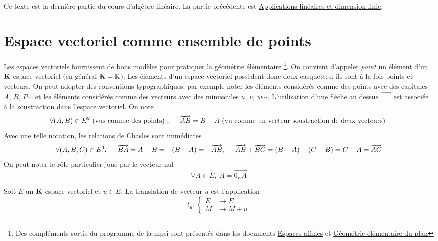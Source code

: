 

Ce texte est la dernière partie du cours d'algèbre linéaire. La partie précédente est \href{\baseurl C9587.pdf}{Applications linéaires et dimension finie}.

\section{Espace vectoriel comme ensemble de points}
Les espaces vectoriels fournissent de bons modèles pour pratiquer la géométrie élémentaire \footnote{Des compléments sortis du programme de la mpsi sont présentés dans les documents \href{\baseurl C5727.pdf}{Espaces affines} et \href{\baseurl C2005.pdf}{Géométrie élémentaire du plan}}.\newline
On convient d'appeler \emph{point} un élément d'un $\mathbf{K}$-espace vectoriel (en général $\mathbf{K} = \mathbb{R}$). Les éléments d'un espace vectoriel possèdent donc deux \og casquettes\fg: ils sont à la fois points et vecteurs. On peut adopter des conventions typographiques; par exemple noter les éléments considérés comme des points avec des capitales $A$, $B$, $P\cdots$ et les éléments considérés comme des vecteurs avec des minuscules $u$, $v$, $w\cdots$.\newline
L'utilisation d'une flèche au dessus $\overrightarrow{\phantom{AB}}$ est associée à la soustraction dans l'espace vectoriel. On note
\begin{displaymath}
  \forall (A,B)\in E^2 \text{ (vus comme des points) }, \hspace{0.5cm}
  \overrightarrow{AB} = B - A \text{ (vu comme un vecteur soustraction de deux vecteurs) }
\end{displaymath}
Avec une telle notation, les relations de Chasles  sont immédiates
\begin{displaymath}
  \forall (A,B,C)\in E^3, \hspace{0.5cm} \overrightarrow{BA} = A - B = -(B-A) = -\overrightarrow{AB},\hspace{0.5cm}
\overrightarrow{AB} + \overrightarrow{BC} = (B-A) + (C-B) = C - A = \overrightarrow{AC}
  \end{displaymath}
On peut noter le rôle particulier joué par le vecteur nul
\begin{displaymath}
  \forall A \in E, \; A = \overrightarrow{0_E A}
\end{displaymath}
\begin{defi}[translation]
  Soit $E$ un $\mathbf{K}$-espace vectoriel et $u\in E$. La translation de vecteur $u$ est l'application
  \begin{displaymath}
    t_u:
    \left\lbrace 
    \begin{aligned}
      E &\rightarrow E \\ M &\mapsto M + u
    \end{aligned}
\right. 
  \end{displaymath}
\end{defi}
